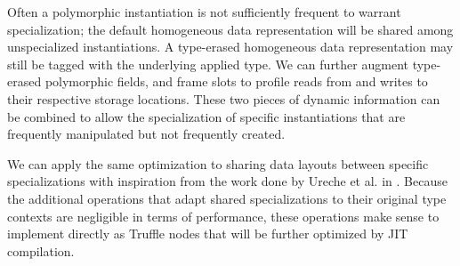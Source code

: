 Often a polymorphic instantiation is not sufficiently frequent to warrant specialization; the default homogeneous data representation will be shared among unspecialized instantiations.
A type-erased homogeneous data representation may still be tagged with the underlying applied type.
We can further augment type-erased polymorphic fields, and frame slots to profile reads from and writes to their respective storage locations.
These two pieces of dynamic information can be combined to allow the specialization of specific instantiations that are frequently manipulated but not frequently created.

We can apply the same optimization to sharing data layouts between specific specializations with inspiration from the work done by Ureche et al. in \cite{scala:miniboxing}.
Because the additional operations that adapt shared specializations to their original type contexts are negligible in terms of performance\cite{scala:miniboxing}, these operations make sense to implement directly as Truffle nodes that will be further optimized by JIT compilation.